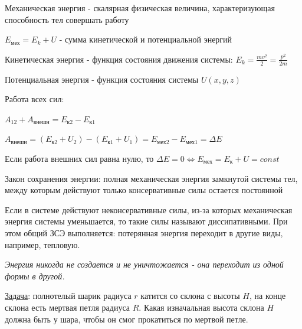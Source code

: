 \documentclass[12pt]{article}
\begin{document}
    Механическая энергия - скалярная физическая величина, характеризующая способность тел совершать работу

    $E_\text{мех} = E_k + U$ - сумма кинетической и потенциальной энергий

    Кинетическая энергия - функция состояния движения системы: $E_k = \frac{mv^2}{2} = \frac{p^2}{2m}$

    Потенциальная энергия - функция состояния системы $U(x, y, z)$

    Работа всех сил:

    $A_{12} + A_\text{внешн} = E_{\text{к}2} - E_{\text{к}1}$

    $A_\text{внешн} = (E_{\text{к}2} + U_2) - (E_{\text{к}1} + U_1) = E_\text{мех2} - E_\text{мех1} = \Delta E$

    Если работа внешних сил равна нулю, то $\Delta E = 0 \Longleftrightarrow E_\text{мех} = E_\text{к} + U = const$ 
    
    Закон сохранения энергии: полная механическая энергия замкнутой системы тел, между которым действуют только консервативные силы остается постоянной

    Если в системе действуют неконсервативные силы, из-за которых механическая энергия системы уменьшается, то такие силы называют диссипативными. 
    При этом общий ЗСЭ выполняется: потерянная энергия переходит в другие виды, например, тепловую.

    \textit{Энергия никогда не создается и не уничтожается - она переходит из одной формы в другой.}

    \mediumvspace

    \underline{Задача}: полнотелый шарик радиуса $r$ катится со склона с высоты $H$, на конце склона есть мертвая петля радиуса $R$.
    Какая изначальная высота склона $H$ должна быть у шара, чтобы он смог прокатиться по мертвой петле.

    \smallvspace
\end{document}
